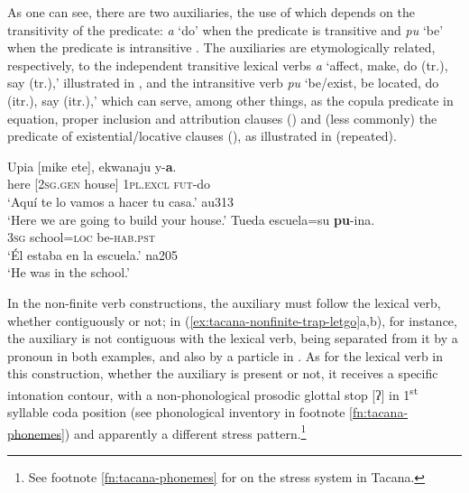 \documentclass[output=paper]{langsci/langscibook}
\begin{document}
As one can see, there are two auxiliaries, the use of which depends on the
transitivity of the predicate: \textit{a} `do' when the predicate is
transitive  and \textit{pu} `be' when the
predicate is intransitive . The auxiliaries
are etymologically related, respectively, to the independent transitive
lexical verbs \textit{a} `affect, make, do (tr.), say (tr.),' illustrated
in , and the intransitive verb
\textit{pu} `be\slash exist, be located, do (itr.), say (itr.),' which can
serve, among other things, as the copula predicate in equation, proper
inclusion and attribution clauses () and (less
commonly) the predicate of existential\slash locative clauses
(), as illustrated in
 (repeated).

\begin{exe}\ex
\label{ex:tacana-auxetymologies-build-school}  
\begin{xlist}
\ex\label{ex:tacana-auxetymologies-build}
\gll Upia  [mike  ete],  ekwanaju  y-\textbf{a}.\\
    here  [\textsc{2sg.gen}  house]  \textsc{1pl.excl}  \textsc{fut}-do\\
\glt `Aquí te lo vamos a hacer tu casa.' au313\\
`Here we are going to build your house.'
\ex\label{ex:tacana-auxetymologies-school}
 \gll   Tueda  escuela=su  \textbf{pu}{-ina}.\\
    3\textsc{sg}  school=\textsc{loc}  be-\textsc{hab.pst}\\
\glt `Él estaba en la escuela.' na205\\
`He was in the school.'
\end{xlist}\end{exe}


In the non-finite verb constructions, the auxiliary must follow the lexical
verb, whether contiguously or not; in
(\ref{ex:tacana-nonfinite-trap-letgo}a,b), for instance, the auxiliary is
not contiguous with the lexical verb, being separated from it by a pronoun
in both examples, and also by a particle in .
As for the lexical verb in this construction, whether the auxiliary is
present or not, it receives a specific intonation contour, with a
non-phonological prosodic glottal stop [ʔ] in 1\textsuperscript{st}
syllable coda position (see phonological inventory in footnote
\ref{fn:tacana-phonemes}) and apparently a different stress
pattern.\footnote{See footnote \ref{fn:tacana-phonemes} for on the stress system in Tacana.}
\end{document}
